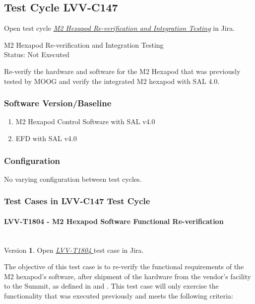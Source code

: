 \documentclass[SE,lsstdraft,STR,toc]{lsstdoc}
\providecommand{\tightlist}{
  \setlength{\itemsep}{0pt}\setlength{\parskip}{0pt}}
\begin{document}
\subsection{Test Cycle LVV-C147 }

Open test cycle {\it \href{https://jira.lsstcorp.org/secure/Tests.jspa#/testrun/LVV-C147}{M2 Hexapod Re-verification and Integration Testing}} in Jira.

M2 Hexapod Re-verification and Integration Testing\\
Status: Not Executed

Re-verify the hardware and software for the M2 Hexapod that was
previously tested by MOOG and verify the integrated M2 hexapod with SAL
4.0.

\subsubsection{Software Version/Baseline}
\begin{enumerate}
\tightlist
\item
  M2 Hexapod Control Software with SAL v4.0
\item
  EFD with SAL v4.0
\end{enumerate}

\subsubsection{Configuration}
No varying configuration between test cycles.

\subsubsection{Test Cases in LVV-C147 Test Cycle}

\paragraph{ LVV-T1804 - M2 Hexapod Software Functional Re-verification }\mbox{}\\

Version \textbf{1}.
Open  \href{https://jira.lsstcorp.org/secure/Tests.jspa#/testCase/LVV-T1804}{\textit{ LVV-T1804 } }
test case in Jira.

The objective of this test case is to re-verify the functional
requirements of the M2 hexapod's software, after shipment of the
hardware from the vendor's facility to the Summit, as defined in 
and . This test case will only exercise the functionality that
was executed previously and meets the following criteria:
\end{document}
